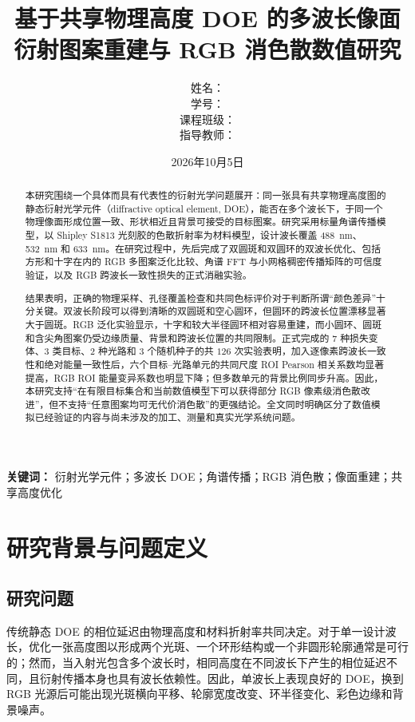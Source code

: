 \documentclass[UTF8,a4paper,12pt]{ctexart}
\title{\heiti 基于共享物理高度 DOE 的多波长像面衍射图案重建与 RGB 消色散数值研究}
\author{姓名：\underline{\hspace{4cm}}\\学号：\underline{\hspace{4cm}}\\课程班级：\underline{\hspace{4cm}}\\指导教师：\underline{\hspace{4cm}}}
\date{2026年10月5日}
\begin{document}
\maketitle
\thispagestyle{empty}

\begin{abstract}
本研究围绕一个具体而具有代表性的衍射光学问题展开：同一张具有共享物理高度图的静态衍射光学元件（diffractive optical element, DOE），能否在多个波长下，于同一个物理像面形成位置一致、形状相近且背景可接受的目标图案。研究采用标量角谱传播模型，以 Shipley S1813 光刻胶的色散折射率为材料模型，设计波长覆盖 \SI{488}{nm}、\SI{532}{nm} 和 \SI{633}{nm}。在研究过程中，先后完成了双圆斑和双圆环的双波长优化、包括方形和十字在内的 RGB 多图案泛化比较、角谱 FFT 与小网格稠密传播矩阵的可信度验证，以及 RGB 跨波长一致性损失的正式消融实验。

结果表明，正确的物理采样、孔径覆盖检查和共同色标评价对于判断所谓“颜色差异”十分关键。双波长阶段可以得到清晰的双圆斑和空心圆环，但圆环的跨波长位置漂移显著大于圆斑。RGB 泛化实验显示，十字和较大半径圆环相对容易重建，而小圆环、圆斑和含尖角图案仍受边缘质量、背景和跨波长位置的共同限制。正式完成的 $7$ 种损失变体、$3$ 类目标、$2$ 种光路和 $3$ 个随机种子的共 $126$ 次实验表明，加入逐像素跨波长一致性和绝对能量一致性后，六个目标--光路单元的共同尺度 ROI Pearson 相关系数均显著提高，RGB ROI 能量变异系数也明显下降；但多数单元的背景比例同步升高。因此，本研究支持“在有限目标集合和当前数值模型下可以获得部分 RGB 像素级消色散改进”，但不支持“任意图案均可无代价消色散”的更强结论。全文同时明确区分了数值模拟已经验证的内容与尚未涉及的加工、测量和真实光学系统问题。
\end{abstract}

\noindent\textbf{关键词：} 衍射光学元件；多波长 DOE；角谱传播；RGB 消色散；像面重建；共享高度优化
\tableofcontents
\newpage

\section{研究背景与问题定义}
\subsection{研究问题}
传统静态 DOE 的相位延迟由物理高度和材料折射率共同决定。对于单一设计波长，优化一张高度图以形成两个光斑、一个环形结构或一个非圆形轮廓通常是可行的；然而，当入射光包含多个波长时，相同高度在不同波长下产生的相位延迟不同，且衍射传播本身也具有波长依赖性。因此，单波长上表现良好的 DOE，换到 RGB 光源后可能出现光斑横向平移、轮廓宽度改变、环半径变化、彩色边缘和背景噪声。
\end{document}
